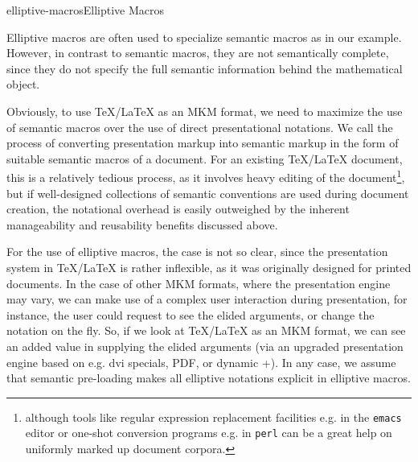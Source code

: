 \begin{description}
\begin{myfig}{elliptive-macros}{Elliptive Macros}\footnotesize
\begin{boxedverbatim}
\def\interpret#1#2#3{{\left[\kern-0.18em\left[#1\right]\kern-0.18em\right]^{#2}_{#3}}}
\def\intermp#1{\interpret{#1}{{\cal M}}{\phi}}
\def\interm#1{\interpret{#1}{{\cal M}}{}}
\def\interp#1{\interpret{#1}{}{\phi}}
\def\interoo#1{\interpret{#1}{}{}}
\end{boxedverbatim}  
\end{myfig}
Elliptive macros are often used to specialize semantic macros as in our example.
However, in contrast to semantic macros, they are not semantically complete, since
they do not specify the full semantic information behind the mathematical object.
\end{description}

Obviously, to use {\TeX/\LaTeX} as an MKM format, we need to maximize the use of
semantic macros over the use of direct presentational notations. We call the
process of converting presentation markup into semantic markup in the form of
suitable semantic macros {} of a document. For an
existing {\TeX/\LaTeX} document, this is a relatively tedious process, as it
involves heavy editing of the document\footnote{although tools like regular
  expression replacement facilities e.g. in the {\tt{emacs}} editor or one-shot
  conversion programs e.g. in {\tt{perl}} can be a great help on uniformly marked
  up document corpora.}, but if well-designed collections of semantic conventions
are used during document creation, the notational overhead is easily outweighed by
the inherent manageability and reusability benefits discussed above.

For the use of elliptive macros, the case is not so clear, since the presentation
system in {\TeX/\LaTeX} is rather inflexible, as it was originally designed for
printed documents. In the case of other MKM formats, where the presentation engine
may vary, we can make use of a complex user interaction during presentation, for
instance, the user could request to see the elided arguments, or change the
notation on the fly. So, if we look at {\TeX/\LaTeX} as an MKM format, we can see
an added value in supplying the elided arguments (via an upgraded presentation
engine based on e.g. dvi specials, PDF, or dynamic {\xhtml}+{\mathml}). In any
case, we assume that semantic pre-loading makes all elliptive notations explicit
in elliptive macros.


